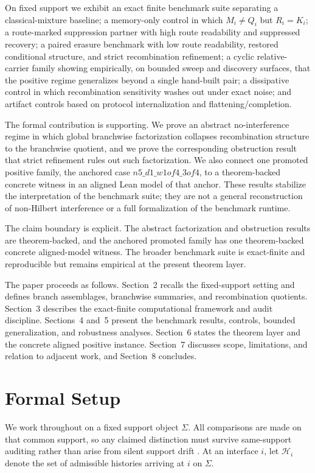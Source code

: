 \documentclass[11pt]{article}
\theoremstyle{definition}
\begin{document}
On fixed support we exhibit an exact finite benchmark suite separating a classical-mixture baseline; a memory-only control in which $M_i \neq Q_i$ but $R_i = K_i$; a route-marked suppression partner with high route readability and suppressed recovery; a paired erasure benchmark with low route readability, restored conditional structure, and strict recombination refinement; a cyclic relative-carrier family showing empirically, on bounded sweep and discovery surfaces, that the positive regime generalizes beyond a single hand-built pair; a dissipative control in which recombination sensitivity washes out under exact noise; and artifact controls based on protocol internalization and flattening/completion.

The formal contribution is supporting. We prove an abstract no-interference regime in which global branchwise factorization collapses recombination structure to the branchwise quotient, and we prove the corresponding obstruction result that strict refinement rules out such factorization. We also connect one promoted positive family, the anchored case $n5\_d1\_w1of4\_3of4$, to a theorem-backed concrete witness in an aligned Lean model of that anchor. These results stabilize the interpretation of the benchmark suite; they are not a general reconstruction of non-Hilbert interference or a full formalization of the benchmark runtime.

The claim boundary is explicit. The abstract factorization and obstruction results are theorem-backed, and the anchored promoted family has one theorem-backed concrete aligned-model witness. The broader benchmark suite is exact-finite and reproducible but remains empirical at the present theorem layer.

The paper proceeds as follows. Section~2 recalls the fixed-support setting and defines branch assemblages, branchwise summaries, and recombination quotients. Section~3 describes the exact-finite computational framework and audit discipline. Sections~4 and~5 present the benchmark results, controls, bounded generalization, and robustness analyses. Section~6 states the theorem layer and the concrete aligned positive instance. Section~7 discusses scope, limitations, and relation to adjacent work, and Section~8 concludes.

\section{Formal Setup}

We work throughout on a fixed support object \(\Sigma\). All comparisons are made on that common support, so any claimed distinction must survive same-support auditing rather than arise from silent support drift \cite{Tsiokos2026EventPackages}.
At an interface \(i\), let \(\mathcal H_i\) denote the set of admissible histories arriving at \(i\) on \(\Sigma\).
\end{document}
